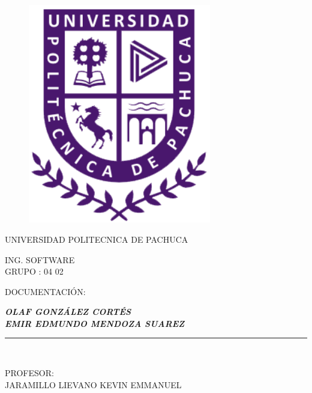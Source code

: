 \documentclass{article}
\begin{document}
\begin{titlepage}

\begin{center}
\vspace*{-1in}
\begin{figure}[htb]
\begin{center}
\includegraphics[width=8cm]{./imagenes/upp.png}
\end{center}
\end{figure}
\begin{large}
UNIVERSIDAD POLITECNICA DE PACHUCA\\
\end{large}

\vspace*{0.15in}
ING. SOFTWARE\\
GRUPO : 04 02\\
\vspace*{0.6in}
\begin{large}
DOCUMENTACIÓN:\\
\end{large}
\vspace*{0.2in}
\begin{Large}
\textbf{\textit{OLAF GONZÁLEZ CORTÉS}}\\
\textbf{\textit{EMIR EDMUNDO MENDOZA SUAREZ}}\\
\end{Large}
\vspace*{0.3in}
\vspace*{0.3in}
\rule{80mm}{0.1mm}\\
\vspace*{0.1in}
\begin{large}
PROFESOR: \\
JARAMILLO LIEVANO KEVIN EMMANUEL	 \\
\end{large}
\end{center}

\end{titlepage}

\newpage


\newpage


\newpage



\end{document}
